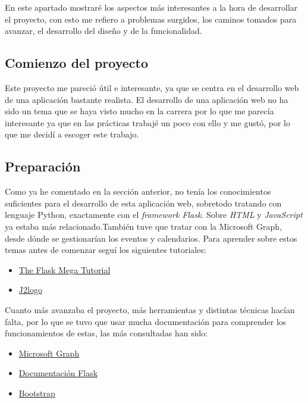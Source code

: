 
En este apartado mostraré los aspectos más interesantes a la hora de desarrollar el proyecto, con esto me refiero a problemas surgidos, los caminos tomados para avanzar, el desarrollo del diseño y de la funcionalidad.

\subsection{Comienzo del proyecto}
Este proyecto me pareció útil e interesante, ya que se centra en el desarrollo web de una aplicación bastante realista. El desarrollo de una aplicación web no ha sido un tema que se haya visto mucho en la carrera por lo que me parecía interesante ya que en las prácticas trabajé un poco con ello y me gustó, por lo que me decidí a escoger este trabajo.   

\subsection{Preparación}
Como ya he comentado en la sección anterior, no tenía los conocimientos suficientes para el desarrollo de esta aplicación web, sobretodo tratando con lenguaje Python, exactamente con el \textit{framework Flask}. Sobre \textit{HTML} y \textit{JavaScript} ya estaba más relacionado.También tuve que tratar con la Microsoft Graph, desde dónde se gestionarían los eventos y calendarios.\newline
Para aprender sobre estos temas antes de comenzar seguí los siguientes tutoriales:\newline

\begin{itemize}
\item \href{https://blog.miguelgrinberg.com/post/the-flask-mega-tutorial-part-i-hello-world}{The Flask Mega Tutorial}\cite{flaskMegaTutorial}
\item \href{https://j2logo.com/tutorial-flask-espanol/}{J2logo}\cite{j2logo}
\end{itemize}
Cuanto más avanzaba el proyecto, más herramientas y distintas técnicas hacían falta, por lo que se tuvo que usar mucha documentación para comprender los funcionamientos de estas, las más consultadas han sido:
\begin{itemize}
\item \href{https://docs.microsoft.com/es-es/graph/api/overview?view=graph-rest-1.0}{Microsoft Graph}\cite{microsoftGraph}
\item \href{https://flask.palletsprojects.com/en/1.1.x/}{Documentación Flask}\cite{Flask}
\item \href{https://getbootstrap.com/docs/4.5/getting-started/introduction/}{Bootstrap}\cite{Bootstrap}
\end{itemize}

